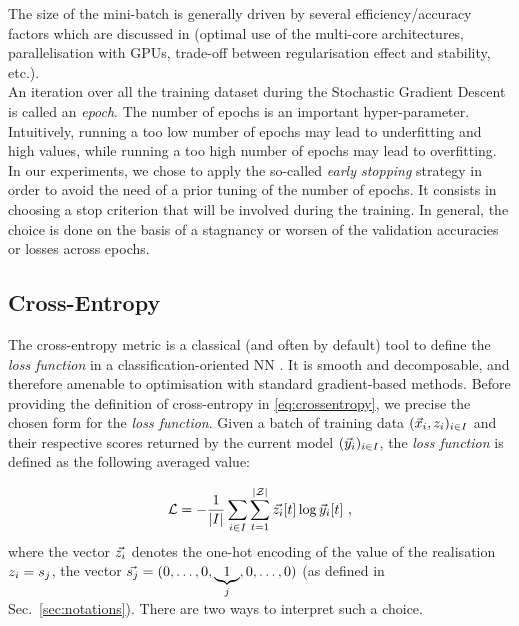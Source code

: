 The size of the mini-batch is generally
driven by several efficiency/accuracy factors which are \eg discussed in
\cite{GBC16} (\eg optimal use of the multi-core architectures, parallelisation
with GPUs, trade-off between regularisation effect and stability, etc.). \\

An iteration over all the training dataset during the Stochastic Gradient Descent is called an \emph{epoch}.
The number of epochs is an important hyper-parameter. Intuitively, running a too low number of epochs may lead to underfitting and high values, while running a too high number of epochs may lead to overfitting. In our experiments, we chose to apply the so-called \emph{early stopping} strategy \cite{Prechelt2012}  in order to avoid the need of a prior tuning of the number of epochs. It consists in choosing a stop criterion that will be involved during the training. In general, the choice is done on the basis of a stagnancy or  worsen of the validation accuracies or losses across epochs.\\

\subsection{Cross-Entropy}
The cross-entropy
metric is a classical (and often by default) tool to define the \emph{loss function} in a classification-oriented NN \cite{LCH05,Goodfellow-et-al-2016}. It is smooth and
decomposable, and therefore amenable to optimisation with standard
gradient-based methods. Before providing the definition of cross-entropy in \eqref{eq:crossentropy}, we precise the chosen form for the \emph{loss function}. Given a batch of training data $(\vec{x}_i, z_i)_{i\in I}$ and their respective scores returned by the current model $(\vec{y}_i)_{i\in I}$, the \emph{loss function} is defined as the following averaged value:

\begin{equation}\label{eq:lossfunction}
\mathcal{L} = -\frac{1}{\lvert I \rvert} \sum_{i\in I} \sum_{t=1}^{|\mathcal{Z}|}\vec{z_i}[t]\log{\ensuremath {\vec{y}}_i[t]} \mbox{ ,}
\end{equation}   
where the vector $\vec{z_i}$ denotes the one-hot encoding of the value of the realisation $z_i=s_{j}$, \ie the vector $\vec{s_{j}} = (0,\ldots , 0,\underbrace{1}_{j},0,\dots,0)$ (as defined in Sec.~\ref{sec:notations}).
There are two ways to interpret such a choice. 

